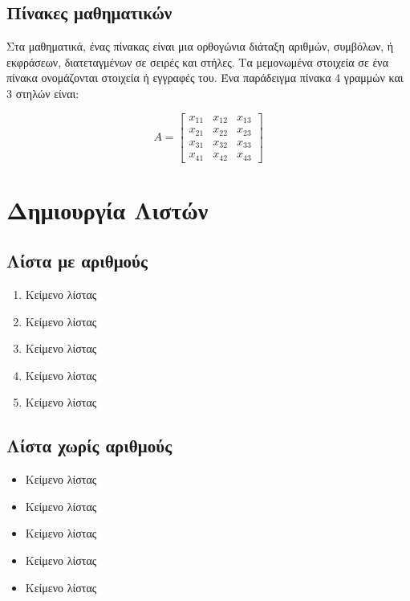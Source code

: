 \documentclass[a4paper,titlepage,oneside,12pt]{article}
\begin{document}
\subsection{Πίνακες μαθηματικών}
\begin{minipage}{.65\linewidth}
Στα μαθηματικά, ένας πίνακας είναι μια ορθογώνια διάταξη αριθμών, συμβόλων, ή εκφράσεων, διατεταγμένων σε σειρές και στήλες. 
Τα μεμονωμένα στοιχεία σε ένα πίνακα ονομάζονται στοιχεία ή εγγραφές του. Ένα παράδειγμα πίνακα 4 γραμμών και 3 στηλών είναι:
\end{minipage}
\begin{minipage}{0.33\linewidth}

\[
  A = 
  \begin{bmatrix} 
    x_{11} & x_{12} & x_{13}\\ 
    x_{21} & x_{22} & x_{23}\\
    x_{31} & x_{32} & x_{33}\\
    x_{41} & x_{42} & x_{43}
  \end{bmatrix}
\]

\end{minipage}
\newpage
\section{Δημιουργία Λιστών}
\begin{minipage}{0.45\linewidth}
\subsection{Λίστα με αριθμούς}
\begin{enumerate}
\item Κείμενο λίστας
\item Κείμενο λίστας
\item Κείμενο λίστας
\item Κείμενο λίστας
\item Κείμενο λίστας
\end{enumerate}
\end{minipage}
\begin{minipage}{0.45\linewidth}
\centering
\subsection{Λίστα χωρίς αριθμούς}
\begin{itemize}
\centering
\item Κείμενο λίστας
\item Κείμενο λίστας
\item Κείμενο λίστας
\item Κείμενο λίστας
\item Κείμενο λίστας
\end{itemize}
\end{minipage}
\end{document}
